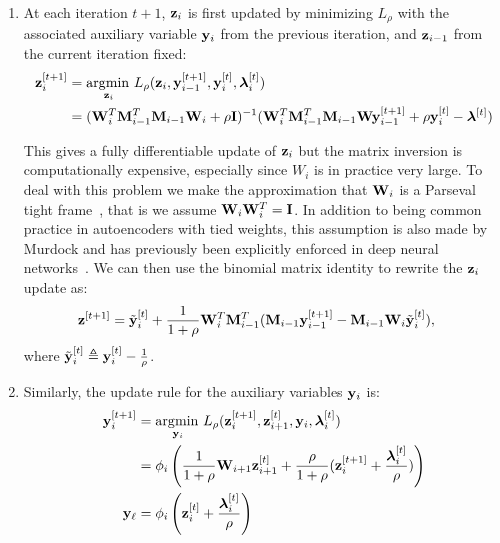 \begin{enumerate}
\item
 At each iteration $t+1$, $\mathbf{z}_i$ is first updated by minimizing $L_\rho$ with the associated auxiliary variable $\mathbf{y}_i$ from the previous iteration, and $\mathbf{z}_{i-1}$ from the current iteration fixed:
  \begin{equation}
    \begin{aligned}
      \mathbf{z}^{[t+1]}_i & = \operatorname*{\arg\!\min\,}_{\mathbf{z}_i} L_\rho(\mathbf{z}_i, \mathbf{y}^{[t+1]}_{i-1}, \mathbf{y}^{[t]}_i, \bm{\lambda}_i^{[t]})\\
      &= (\mathbf{W}_i^T\mathbf{M}_{i-1}^T\mathbf{M}_{i-1}\mathbf{W}_i + \rho \mathbf{I})^{-1}(\mathbf{W}_{i}^T\mathbf{M}_{i-1}^T\mathbf{M}_{i-1}\mathbf{W}\mathbf{y}^{[t+1]}_{i-1} + \rho \mathbf{y}^{[t]}_{i} - \bm{\lambda}^{[t]})
    \end{aligned}
    \label{eq:wupdate1}  
  \end{equation}

  This gives a fully differentiable update of $\mathbf{z}_i$ but the matrix inversion is computationally expensive, especially since $W_i$ is in practice very large. To deal with this problem we make the approximation that $\mathbf{W}_i$ is a Parseval tight frame~\cite{murdock}, that is we assume $\mathbf{W}_i\mathbf{W}_i^T = \mathbf{I}$. In addition to being common practice in autoencoders with tied weights, this assumption is also made by Murdock \etal and has previously been explicitly enforced in deep neural networks~\cite{moustapha}. We can then use the binomial matrix identity to rewrite the $\mathbf{z}_i$ update as:
  \begin{equation}
    \begin{aligned}
      \mathbf{z}^{[t+1]} &= \tilde{\mathbf{y}}_i^{[t]} + \frac{1}{1 + \rho}\mathbf{W}^T_i\mathbf{M}_{i-1}^T(\mathbf{M}_{i-1}\mathbf{y}^{[t+1]}_{i-1} - \mathbf{M}_{i-1}\mathbf{W}_i\tilde{\mathbf{y}}^{[t]}_i),
    \end{aligned}\label{eq:zupdate}
  \end{equation}
  where $\tilde{\mathbf{y}}_i^{[t]} \triangleq \mathbf{y}_i^{[t]} - \frac{1}{\rho}$.
\item
 Similarly, the update rule for the auxiliary variables $\mathbf{y}_i$ is:
  \begin{equation}
    \begin{aligned}
      \mathbf{y}_i^{[t+1]} & = \operatorname*{\arg\!\min\,}_{\mathbf{y}_i} L_\rho(\mathbf{z}^{[t+1]}_i, \mathbf{z}^{[t]}_{i+1}, \mathbf{y}_i, \bm{\lambda}_i^{[t]})\\
      &= \phi_i\left(\frac{1}{1+\rho}\mathbf{W}_{i+1}\mathbf{z}^{[t]}_{i+1} + \frac{\rho}{1+\rho}(\mathbf{z}^{[t+1]}_i + \frac{\bm{\lambda}_i^{[t]}}{\rho})\right)\\
      \mathbf{y}_{\ell} &= \phi_i\left(\mathbf{z}_i^{[t]} + \frac{\bm{\lambda}_i^{[t]}}{\rho}\right)
    \end{aligned}\label{eq:yupdate}
  \end{equation}


\end{enumerate}

